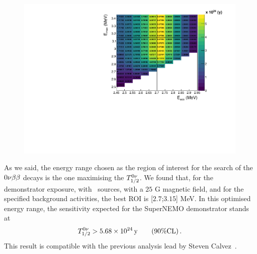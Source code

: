 \begin{figure}[h]
  \centering
  \includegraphics[width=1.1\textwidth]{Sensitivity/fig_sensitivity/sensitivity_spectrum_with_B_82Se.pdf}
  \caption{
    \label{fig:sensitivity_cont}}
\end{figure}
As we said, the energy range chosen as the region of interest for the search of the $0\nu\beta\beta$ decays is the one maximising the $T_{1/2}^{0\nu}$.
We found that, for the demonstrator exposure, with \Se\ sources, with a $25$ G magnetic field, and for the specified background activities, the best ROI is [$2.7$;$3.15$] MeV.
In this optimised energy range, the sensitivity expected for the SuperNEMO demonstrator stands at
\begin{equation}
T_{1/2}^{0\nu} > 5.68\times 10^{24}\,\text{y}\qquad (90\% \text{CL})\,.
\end{equation}
This result is compatible with the previous analysis lead by Steven Calvez~\cite{CalvezThesis}.



